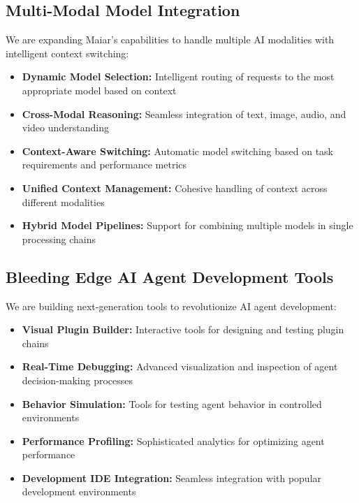 \documentclass[12pt]{article}
\begin{document}
\subsection{Multi-Modal Model Integration}
We are expanding Maiar's capabilities to handle multiple AI modalities with intelligent context switching:
\begin{itemize}
    \item \textbf{Dynamic Model Selection:} Intelligent routing of requests to the most appropriate model based on context
    
    \item \textbf{Cross-Modal Reasoning:} Seamless integration of text, image, audio, and video understanding
    
    \item \textbf{Context-Aware Switching:} Automatic model switching based on task requirements and performance metrics
    
    \item \textbf{Unified Context Management:} Cohesive handling of context across different modalities
    
    \item \textbf{Hybrid Model Pipelines:} Support for combining multiple models in single processing chains
\end{itemize}

\subsection{Bleeding Edge AI Agent Development Tools}
We are building next-generation tools to revolutionize AI agent development:
\begin{itemize}
    \item \textbf{Visual Plugin Builder:} Interactive tools for designing and testing plugin chains
    
    \item \textbf{Real-Time Debugging:} Advanced visualization and inspection of agent decision-making processes
    
    \item \textbf{Behavior Simulation:} Tools for testing agent behavior in controlled environments
    
    \item \textbf{Performance Profiling:} Sophisticated analytics for optimizing agent performance
    
    \item \textbf{Development IDE Integration:} Seamless integration with popular development environments
\end{itemize}
\end{document}
